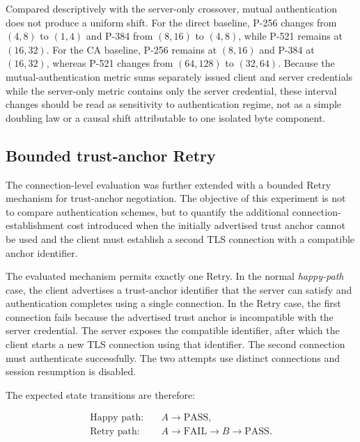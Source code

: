 \documentclass[journal]{IEEEtran}
\begin{document}
Compared descriptively with the server-only crossover, mutual authentication does not produce a uniform shift. For the direct baseline, P-256 changes from $(4,8)$ to $(1,4)$ and P-384 from $(8,16)$ to $(4,8)$, while P-521 remains at $(16,32)$. For the CA baseline, P-256 remains at $(8,16)$ and P-384 at $(16,32)$, whereas P-521 changes from $(64,128)$ to $(32,64)$. Because the mutual-authentication metric sums separately issued client and server credentials while the server-only metric contains only the server credential, these interval changes should be read as sensitivity to authentication regime, not as a simple doubling law or a causal shift attributable to one isolated byte component.

\subsection{Bounded trust-anchor Retry}

\label{sec:retry}



The connection-level evaluation was further extended with a bounded Retry
mechanism for trust-anchor negotiation. The objective of this experiment is
not to compare authentication schemes, but to quantify the additional
connection-establishment cost introduced when the initially advertised trust
anchor cannot be used and the client must establish a second TLS connection
with a compatible anchor identifier.



The evaluated mechanism permits exactly one Retry. In the normal
\emph{happy-path} case, the client advertises a trust-anchor identifier that
the server can satisfy and authentication completes using a single
connection. In the Retry case, the first connection fails because the
advertised trust anchor is incompatible with the server credential. The
server exposes the compatible identifier, after which the client starts a
new TLS connection using that identifier. The second connection must
authenticate successfully. The two attempts use distinct connections and
session resumption is disabled.



The expected state transitions are therefore:



\begin{equation}
\begin{aligned}
\text{Happy path:}\quad&
A \rightarrow \mathrm{PASS},
\\
\text{Retry path:}\quad&
A \rightarrow \mathrm{FAIL}
\rightarrow B \rightarrow \mathrm{PASS}.
\end{aligned}
\end{equation}
\end{document}
